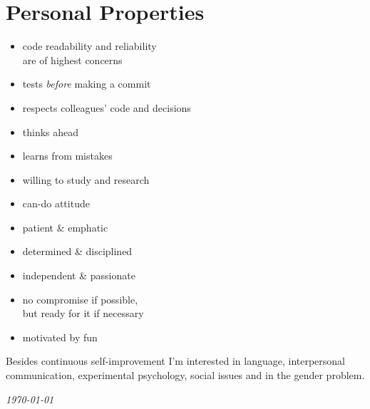 \documentclass[a4paper,12pt]{article}
\newcommand{\compress}{\setlength\itemsep{-\parskip}}
\newenvironment{compressedItemize}{\begin{itemize}\compress}{\end{itemize}}
\begin{document}
\section{Personal Properties}

\begin{multicols}{2}
\begin{compressedItemize}
\item	code readability and reliability \\ are of highest concerns
\item	tests \textit{before} making a commit
\item	respects colleagues' code and decisions
\item	thinks ahead
\item	learns from mistakes
\item	willing to study and research
\columnbreak
\item	can-do attitude
\item	patient \& emphatic
\item	determined \& disciplined
\item	independent \& passionate
\item	no compromise if possible, \\ but ready for it if necessary
\item	motivated by fun
\end{compressedItemize}
\end{multicols}

\medskip

Besides continuous self-improvement I'm interested in language,
interpersonal communication, experimental psychology, social issues
and in the gender problem.

\center\itshape\today
\end{document}
